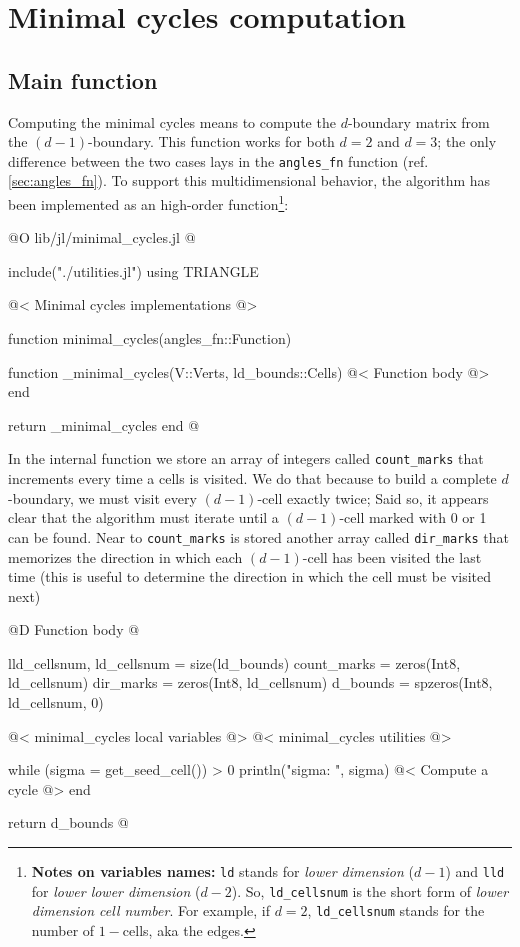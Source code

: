 \chapter{Minimal cycles computation}
\label{ch:minimal_cycles}

\section{Main function}


Computing the minimal cycles means to compute the $d$-boundary matrix
from the $(d-1)$-boundary. This function works for both $d=2$ and $d=3$;
the only difference between the two cases lays in the \texttt{angles\_fn}
function (ref. \ref{sec:angles_fn}). To support this multidimensional
behavior, the algorithm has been implemented as an high-order function\footnote{
    \textbf{Notes on variables names:} \texttt{ld} stands for \textit{lower dimension} ($d-1$)
    and \texttt{lld} for \textit{lower lower dimension} ($d-2$). So, \texttt{ld\_cellsnum} is the
    short form of \textit{lower dimension cell number}. For example, if $d=2$, \texttt{ld\_cellsnum} stands for the
    number of $1-$cells, aka the edges.
}:

@O lib/jl/minimal_cycles.jl
@{include("./utilities.jl")
using TRIANGLE

@< Minimal cycles implementations @>

function minimal_cycles(angles_fn::Function)

    function _minimal_cycles(V::Verts, ld_bounds::Cells)
        @< Function body @>
    end

    return _minimal_cycles
end
@}

In the internal function we store an array of integers called \texttt{count\_marks} 
that increments every time a cells is visited. We do that because to build 
a complete $d$-boundary, we must visit every $(d-1)$-cell exactly twice;
Said so, it appears clear that the algorithm must iterate until a $(d-1)$-cell 
marked with 0 or 1 can be found. Near to \texttt{count\_marks} is stored another
array called \texttt{dir\_marks} that memorizes the direction in which each $(d-1)$-cell
has been visited the last time (this is useful to determine the direction in which the cell
must be visited next)

@D Function body
@{lld_cellsnum, ld_cellsnum = size(ld_bounds)
count_marks = zeros(Int8, ld_cellsnum)
dir_marks = zeros(Int8, ld_cellsnum)
d_bounds = spzeros(Int8, ld_cellsnum, 0)

@< minimal\_cycles local variables @>
@< minimal\_cycles utilities @>

while (sigma = get_seed_cell()) > 0
    println("sigma: ", sigma)
    @< Compute a cycle @>
end

return d_bounds
@}

